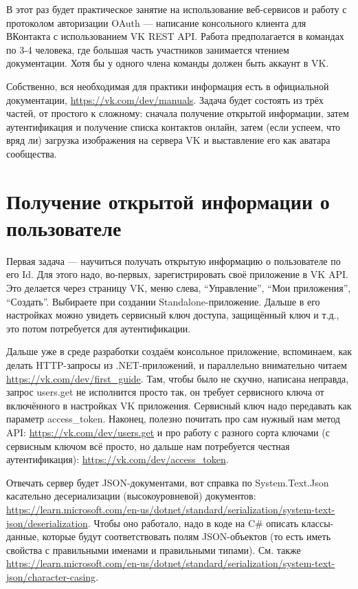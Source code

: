 \documentclass{../../text-style}
\begin{document}
\maketitle
\thispagestyle{empty}

В этот раз будет практическое занятие на использование веб-сервисов и работу с протоколом авторизации OAuth --- написание консольного клиента для ВКонтакта с использованием VK REST API. Работа предполагается в командах по 3-4 человека, где большая часть участников занимается чтением документации. Хотя бы у одного члена команды должен быть аккаунт в VK.

Собственно, вся необходимая для практики информация есть в официальной документации, \url{https://vk.com/dev/manuals}. Задача будет состоять из трёх частей, от простого к сложному: сначала получение открытой информации, затем аутентификация и получение списка контактов онлайн, затем (если успеем, что вряд ли) загрузка изображения на сервера VK и выставление его как аватара сообщества.

\section{Получение открытой информации о пользователе}

Первая задача --- научиться получать открытую информацию о пользователе по его Id. Для этого надо, во-первых, зарегистрировать своё приложение в VK API. Это делается через страницу VK, меню слева, \enquote{Управление}, \enquote{Мои приложения}, \enquote{Создать}. Выбираете при создании Standalone-приложение. Дальше в его настройках можно увидеть сервисный ключ доступа, защищённый ключ и т.д., это потом потребуется для аутентификации.

Дальше уже в среде разработки создаём консольное приложение, вспоминаем, как делать HTTP-запросы из .NET-приложений, и параллельно внимательно читаем \url{https://vk.com/dev/first_guide}. Там, чтобы было не скучно, написана неправда, запрос users.get не исполнится просто так, он требует сервисного ключа от включённого в настройках VK приложения. Сервисный ключ надо передавать как параметр access\_token. Наконец, полезно почитать про сам нужный нам метод API: \url{https://vk.com/dev/users.get} и про работу с разного сорта ключами (с сервисным ключом всё просто, но дальше нам потребуется честная аутентификация): \url{https://vk.com/dev/access_token}.

Отвечать сервер будет JSON-документами, вот справка по System.Text.Json касательно десериализации (высокоуровневой) документов: \url{https://learn.microsoft.com/en-us/dotnet/standard/serialization/system-text-json/deserialization}. Чтобы оно работало, надо в коде на C\# описать классы-данные, которые будут соответствовать полям JSON-объектов (то есть иметь свойства с правильными именами и правильными типами). См. также \url{https://learn.microsoft.com/en-us/dotnet/standard/serialization/system-text-json/character-casing}.
\end{document}
